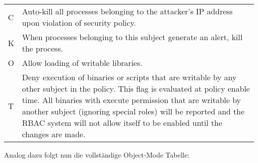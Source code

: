 \begin{tabular}{|lp{13cm}|}
C & Auto-kill all processes belonging to the attacker's IP address upon violation of security policy.\\
K & When processes belonging to this subject generate an alert, kill the process.\\
O & Allow loading of writable libraries.\\
T & Deny execution of binaries or scripts that are writable by any other subject in the policy. This flag is evaluated at policy enable time. All binaries with execute permission that are writable by another subject (ignoring special roles) will be reported and the RBAC system will not allow itself to be enabled until the changes are made.\\
\hline
\end{tabular}

Analog dazu folgt nun die vollständige Object-Mode Tabelle:\\
